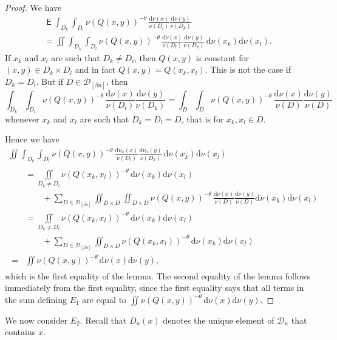 \documentclass[11pt]{article}
\theoremstyle{definition}
\numberwithin{equation}{section}
\numberwithin{figure}{section}
\numberwithin{table}{section}
\DeclareMathOperator{\E}{\mathsf{E}}
\newcommand*{\dd}{\mathrm{d}}
\begin{document}
\begin{proof}
We have
\begin{multline*}
\E \int_{D_k} \int_{D_l} \nu (Q(x,y))^{-\theta} \,
\frac{\dd \nu (x)}{\nu (D_l)} \frac{\dd \nu (y)}{\nu (D_k)} \\ = \iint \int_{D_k} \int_{D_l} \nu (Q(x,y))^{-\theta} \, \frac{\dd \nu (x)}{\nu (D_l)}
\frac{\dd \nu (y)}{\nu (D_k)} \, \dd \nu (x_k)
\dd \nu (x_l).
\end{multline*}
If $x_k$ and $x_l$ are such that $D_k \neq D_l$, then $Q(x,y)$ is constant for $(x,y) \in D_k \times D_l$ and in fact $Q(x,y) = Q(x_k,x_l)$. This is not the case if $D_k = D_l$. But if $D \in
\mathscr{D}_{[\beta n]}$, then
\[
\int_{D_k} \int_{D_l} \nu (Q(x,y))^{-\theta} \, \frac{\dd
\nu (x)}{\nu (D_l)} \frac{\dd \nu (y)}{\nu (D_k)} =
\int_D \int_D \nu (Q(x,y))^{-\theta} \, \frac{\dd \nu (x)}{\nu (D)} \frac{\dd \nu (y)}{\nu (D)}
\]
whenever $x_k$ and $x_l$ are such that $D_k = D_l = D$, that is for $x_k, x_l \in D$.

Hence we have
\begin{multline*}
\iint \int_{D_k} \int_{D_l} \nu (Q(x,y))^{-\theta} \,
\frac{\dd \nu_n (x)}{\nu (D_l)} \frac{\dd \nu_n (y)}{\nu (D_k)} \, \dd \nu (x_k) \dd \nu (x_l)\\
\begin{aligned}
&= \iint\limits_{D_k \neq D_l} \nu (Q(x_k,x_l))^{-\theta} \, \dd\nu (x_k) \dd\nu (x_l) \\
&\qquad + \sum_{D \in
\mathscr{D}_{[\beta n]}} \iint_{D\times D} \iint_{D\times D} \nu (Q(x,y))^{-\theta} \, \frac{\dd \nu (x)}{\nu (D)} \frac{\dd \nu (y)}{\nu (D)} \dd \nu (x_k) \dd
\nu (x_l) \\
&= \iint\limits_{D_k \neq D_l} \nu (Q(x_k,x_l))^{-\theta} \, \dd\nu (x_k) \dd\nu (x_l)\\
&\qquad + \sum_{D \in \mathscr{D}_{[\beta n]}} \iint_{D\times D} \nu (Q(x_k,x_l))^{-\theta} \, \dd \nu (x_k) \dd \nu (x_l) \\ = & \iint \nu(Q(x,y))^{-\theta} \, \dd \nu (x)\dd \nu (y),
\end{aligned}
\end{multline*}
which is the first equality of the lemma. The second equality of the lemma follows immediately from the first equality, since the first equality says that all terms in the sum defining $E_1$ are equal to $\iint \nu(Q(x,y))^{-\theta} \, \dd \nu (x) \dd \nu (y)$.
\end{proof}

We now consider $E_2$. Recall that $D_n (x)$ denotes the unique element of $\mathscr{D}_n$ that contains $x$.
\end{document}
